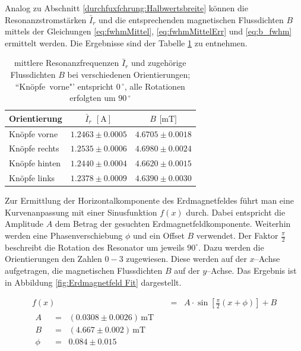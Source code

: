 \documentclass[12pt,a4paper]{scrartcl}
\numberwithin{equation}{section} %
\newcommand{\eqspaced}{\ensuremath{\;\;=\;\;}} %
\begin{document}
Analog zu Abschnitt \ref{durchfuxfchrung:Halbwertsbreite} können die Resonanzstromstärken $\bar{I}_r$ und die entsprechenden magnetischen Flussdichten $B$ mittels der Gleichungen \eqref{eq:fwhmMittel}, \eqref{eq:fwhmMittelErr} und \eqref{eq:b_fwhm} ermittelt werden. Die Ergebnisse sind der Tabelle \ref{table:Erdmagnetfeld Ergebnisse} zu entnehmen.

\begin{table}[h!]
	\centering
	\begin{tabular}{l|c|c}
		Orientierung & $\bar{I}_{r}$ $[\mathrm{A}]$ & $B$ $[\mathrm{mT]}$ \\
		\hline
		Knöpfe vorne  & $1.2463 \pm 0.0005$ & $4.6705 \pm 0.0018$ \\
		Knöpfe rechts & $1.2535 \pm 0.0006$ & $4.6980 \pm 0.0024$ \\
		Knöpfe hinten & $1.2440 \pm 0.0004$ & $4.6620 \pm 0.0015$  \\
		Knöpfe links     & $1.2378 \pm 0.0009$ & $4.6390 \pm 0.0030$
	\end{tabular}
	\caption{mittlere Resonanzfrequenzen $\bar I_r$ und zugehörige Flussdichten $B$ bei verschiedenen Orientierungen;
		``Knöpfe~vorne"' entspricht $0\,^\circ$, alle Rotationen erfolgten um $90\,^\circ$}
	\label{table:Erdmagnetfeld Ergebnisse}
\end{table}

Zur Ermittlung der Horizontalkomponente des Erdmagnetfeldes führt man eine Kurvenanpassung mit einer Sinusfunktion $f(x)$ durch. Dabei entspricht die Amplitude $A$ dem Betrag der gesuchten Erdmagnetfeldkomponente. Weiterhin werden eine Phasenverschiebung $\phi$ und ein Offset $B$ verwendet. Der Faktor $\frac{\pi}{2}$ beschreibt die Rotation des Resonator um jeweils $90^\circ$. Dazu werden die Orientierungen den Zahlen $0-3$ zugewiesen. Diese werden auf der $x$--Achse aufgetragen, die magnetischen Flussdichten $B$ auf der $y$--Achse. Das Ergebnis ist in Abbildung \ref{fig:Erdmagnetfeld Fit} dargestellt.

\begin{align}
	f(x) &\eqspaced A \cdot \sin\left[\frac{\pi}{2}(x + \phi )\right] + B \\
	\begin{split}
		A &\eqspaced (0.0308 \pm 0.0026) \mathrm{\,mT} \\
		B &\eqspaced (4.667 \pm 0.002) \mathrm{\,mT} \\
		\phi &\eqspaced 0.084 \pm 0.015
	\end{split}
\end{align}
\end{document}

